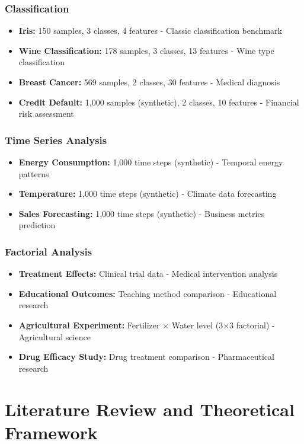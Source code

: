 \documentclass[11pt,a4paper]{article}
\begin{document}
\subsubsection{Classification}
\begin{itemize}
    \item \textbf{Iris:} 150 samples, 3 classes, 4 features - Classic classification benchmark
    \item \textbf{Wine Classification:} 178 samples, 3 classes, 13 features - Wine type classification
    \item \textbf{Breast Cancer:} 569 samples, 2 classes, 30 features - Medical diagnosis
    \item \textbf{Credit Default:} 1,000 samples (synthetic), 2 classes, 10 features - Financial risk assessment
\end{itemize}

\subsubsection{Time Series Analysis}
\begin{itemize}
    \item \textbf{Energy Consumption:} 1,000 time steps (synthetic) - Temporal energy patterns
    \item \textbf{Temperature:} 1,000 time steps (synthetic) - Climate data forecasting
    \item \textbf{Sales Forecasting:} 1,000 time steps (synthetic) - Business metrics prediction
\end{itemize}

\subsubsection{Factorial Analysis}
\begin{itemize}
    \item \textbf{Treatment Effects:} Clinical trial data - Medical intervention analysis
    \item \textbf{Educational Outcomes:} Teaching method comparison - Educational research
    \item \textbf{Agricultural Experiment:} Fertilizer × Water level (3×3 factorial) - Agricultural science
    \item \textbf{Drug Efficacy Study:} Drug treatment comparison - Pharmaceutical research
\end{itemize}

\section{Literature Review and Theoretical Framework}
\end{document}
